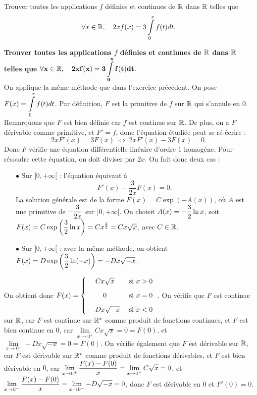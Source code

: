 \documentclass[a4paper, 11pt,reqno]{article}
\begin{document}
\begin{exercice}  \;
Trouver toutes les applications $f$ d\'efinies et continues de $\mathbb{R}$ dans $\mathbb{R}$ telles que
$$\forall x\in\mathbb{R},\quad 2xf(x)=3\int\limits_0^x f(t)dt.$$
\end{exercice}
\begin{correction}  \;
\textbf{Trouver toutes les applications $f$ d\'efinies et continues de $\mathbb{R}$ dans $\mathbb{R}$ telles que $\mathbf{\forall x\in\mathbb{R},\quad \displaystyle 2xf(x)=3\int\limits_0^x f(t)dt.}$}\\
On applique la m\^eme m\'ethode que dans l'exercice pr\'ec\'edent. On pose $F(x) = \displaystyle \int\limits_0^x f(t)dt$. Par d\'efinition, $F$ est la primitive de $f$ sur $\mathbb{R}$ qui s'annule en $0$. Remarquons que $F$ est bien d\'efinie car $f$ est continue sur $\mathbb{R}$. De plus, on a $F$ d\'erivable comme primitive, et $F'= f$, donc l'\'equation \'etudi\'ee peut se r\'e-\'ecrire :
$$2xF'(x) = 3 F(x) \; \Leftrightarrow \; 2 x F'(x) - 3 F(x) = 0.$$
Donc $F$ v\'erifie une \'equation diff\'erentielle lin\'eaire d'ordre $1$ homog\`ene. Pour r\'esoudre cette \'equation, on doit diviser par $2x$. On fait donc deux cas :
\begin{itemize}
\item[$\bullet$] Sur $]0,+\infty[$ : l'\'equation \'equivaut \`a 
$$F'(x) - \frac{3}{2x} F(x) = 0.$$
La solution g\'en\'erale est de la forme $F(x) = C\exp(-A(x))$, o\`u $A$ est une primitive de $\displaystyle -\frac{3}{2x}$ sur $]0,+\infty[$. On choisit $A(x) = -\displaystyle \frac{3}{2} \ln x$, soit $F(x) = C \exp\left( \displaystyle \frac{3}{2} \ln x\right) = C x^{\frac{3}{2}} = C x \sqrt{x}$, avec $C \in \mathbb{R}$.
\item[$\bullet$] Sur $]0,+\infty[$ : avec la m\^eme m\'ethode, on obtient $F(x) =  D \exp\left( \displaystyle \frac{3}{2} \ln (-x)\right) = - D x \sqrt{-x}$.
\end{itemize}
On obtient donc $F(x)=\left\{ \begin{array}{cl}
C x \sqrt{x} & \textmd{ si } x >0\vsec\\
0 & \textmd{ si } x=0\vsec\\
- D x \sqrt{-x} &  \textmd{ si } x <0
\end{array}\right. $. On v\'erifie que $F$ est continue sur $\mathbb{R}$, car $F$ est continue sur $\mathbb{R}^\star$ comme produit de fonctions continues, et $F$ est bien continue en $0$, car $\lim\limits_{x \to 0^+} C x \sqrt{x} = 0 = F(0)$, et $\lim\limits_{x \to 0^-} - D x \sqrt{-x} = 0 = F(0)$. On v\'erifie \'egalement que $F$ est d\'erivable sur $\mathbb{R}$, car $F$ est d\'erivable sur $\mathbb{R}^\star$ comme produit de fonctions d\'erivables, et $F$ est bien d\'erivable en $0$, car $\lim\limits_{x \to 0^+} \displaystyle \frac{F(x)-F(0)}{x} = \lim\limits_{x \to 0^+} C \sqrt{x} = 0$, et $\lim\limits_{x \to 0^-} \displaystyle \frac{F(x)-F(0)}{x} = \lim\limits_{x \to 0^-} -D \sqrt{-x} = 0$, donc $F$ est d\'erivable en $0$ et $F'(0)=0$.\\

\end{correction}
\end{document}
